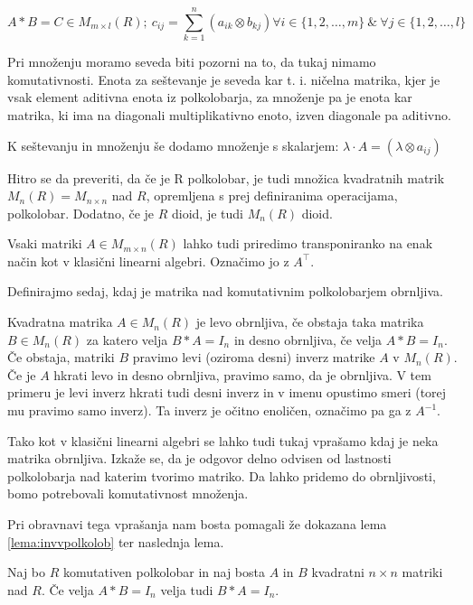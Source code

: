 \documentclass[mat1]{fmfdelo}
\begin{document}
$$ 
	A*B = C \in M_{m\times l}(R);~ c_{ij} = \sum_{k = 1}^{n}(a_{ik}\otimes b_{kj}) \forall i \in \{1, 2, \ldots, m\}~\&~\forall j \in \{1, 2, \ldots, l\}
$$

Pri množenju moramo seveda biti pozorni na to, da tukaj nimamo komutativnosti. Enota za seštevanje je seveda kar t. i. ničelna matrika, kjer je vsak element aditivna enota iz polkolobarja, za množenje pa je enota kar matrika, ki ima na diagonali multiplikativno enoto, izven diagonale pa aditivno.

K seštevanju in množenju še dodamo množenje s skalarjem: $\lambda \cdot A = (\lambda \otimes a_{ij})$

Hitro se da preveriti, da če je R polkolobar, je tudi množica kvadratnih matrik $M_n(R) = M_{n\times n}$ nad $R$, opremljena s prej definiranima operacijama, polkolobar. Dodatno, če je $R$ dioid, je tudi $M_n(R)$ dioid.

Vsaki matriki $A\in M_{m\times n}(R)$ lahko tudi priredimo transponiranko na enak način kot v klasični linearni algebri. Označimo jo z $A^{\top}$.

Definirajmo sedaj, kdaj je matrika nad komutativnim polkolobarjem obrnljiva.

\begin{definicija}\label{def:invmatr}
	Kvadratna matrika $A\in M_n(R)$ je levo obrnljiva, če obstaja taka matrika $B\in M_n(R)$ za katero velja $B*A = I_n$ in desno obrnljiva, če velja $A*B = I_n$. Če obstaja, matriki $B$ pravimo levi (oziroma desni) inverz matrike $A$ v $M_n(R)$. Če je $A$ hkrati levo in desno obrnljiva, pravimo samo, da je obrnljiva. V tem primeru je levi inverz hkrati tudi desni inverz in v imenu opustimo smeri (torej mu pravimo samo inverz). Ta inverz je očitno enoličen, označimo pa ga z $A^{-1}$.
\end{definicija}

Tako kot v klasični linearni algebri se lahko tudi tukaj vprašamo kdaj je neka matrika obrnljiva. Izkaže se, da je odgovor delno odvisen od lastnosti polkolobarja nad katerim tvorimo matriko. Da lahko pridemo do obrnljivosti, bomo potrebovali komutativnost množenja.

Pri obravnavi tega vprašanja nam bosta pomagali že dokazana lema \ref{lema:invvpolkolob} ter naslednja lema.

\begin{lema}\label{lema:ABIBAI}
	Naj bo $R$ komutativen polkolobar in naj bosta $A$ in $B$ kvadratni $n\times n$ matriki nad $R$. Če velja $A*B = I_n$ velja tudi $B*A=I_n$.
\end{lema}
\end{document}
